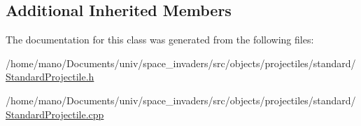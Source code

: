 \subsection*{Additional Inherited Members}


The documentation for this class was generated from the following files\+:\begin{DoxyCompactItemize}
\item 
/home/mano/\+Documents/univ/space\+\_\+invaders/src/objects/projectiles/standard/\hyperlink{StandardProjectile_8h}{Standard\+Projectile.\+h}\item
/home/mano/\+Documents/univ/space\+\_\+invaders/src/objects/projectiles/standard/\hyperlink{StandardProjectile_8cpp}{Standard\+Projectile.\+cpp}\end{DoxyCompactItemize}
